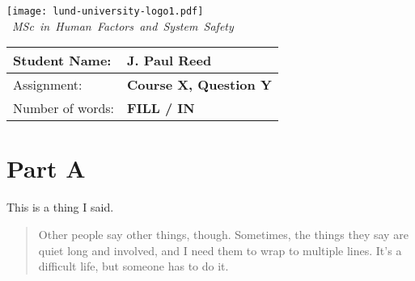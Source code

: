 \documentclass[12pt,letterpaper]{article}
\begin{document}
\vbox{
\hspace*{-0.75cm}\texttt{[image: lund-university-logo1.pdf]}
\bigskip
\newline
\hbox{%
%
\textit{MSc in Human Factors and System Safety}
}
}
\bigskip

\begin{tabular}{| l | >{\noindent\arraybackslash}p{8cm} |}
\hline
Student Name:    & J. Paul Reed \\
\hline
Assignment:      & \textbf{Course X, Question Y} \\
\hline
Number of words: & \textbf{FILL / IN} \\
\hline
\end{tabular}

\section*{Part A}

\begin{linenumbers}
\vspace{\baselineskip}
This is a thing I said.
\par
\medskip
\begin{quote}
Other people say other things, though. Sometimes, the things they say are quiet long and involved, and I need them to wrap to multiple lines. It's a difficult life, but someone has to do it.
\end{quote}

\end{linenumbers}
\par
\bigskip

\printbibliography[title={Reference List:}]
\end{document}
